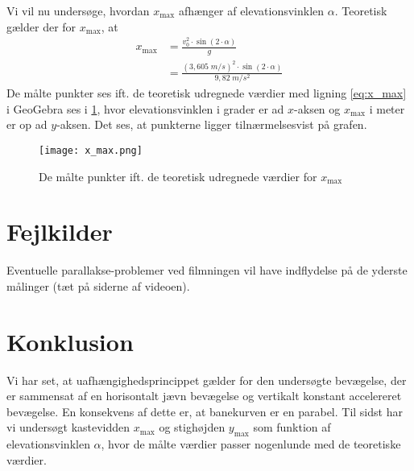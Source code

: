 \documentclass{report}
\begin{document}
Vi vil nu undersøge, hvordan $x_{\text{max} }$ afhænger af elevationsvinklen $\alpha$. 
Teoretisk gælder der for $x_{\text{max} }$, at
\begin{equation}
  \label{eq:x_max}
\begin{split}
  x _{\text{max} }&=\frac{v_0^2 \cdot \sin\left(2 \cdot \alpha\right) }{g}\\
  &=\frac{\left(3,605 \;\unit{m/s} \right)^2 \cdot \sin\left(2 \cdot \alpha\right) }{9,82 \;\unit{m/s^2} }
\end{split}
\end{equation}
De målte punkter ses ift. de teoretisk udregnede værdier med ligning \ref{eq:x_max} i GeoGebra ses i \cref{fig:x_max}, hvor elevationsvinklen i grader er ad $x$-aksen og $x_{\text{max} }$ i meter er op ad $y$-aksen.
Det ses, at punkterne ligger tilnærmelsesvist på grafen.
\begin{figure}[H]
\begin{center}
  \texttt{[image: x\_max.png]}
\end{center}
\caption{De målte punkter ift. de teoretisk udregnede værdier for $x_{\text{max} }$}
\label{fig:x_max}
\end{figure}

\section*{Fejlkilder}
Eventuelle parallakse-problemer ved filmningen vil have indflydelse på de yderste målinger (tæt på siderne af videoen).

\section*{Konklusion}
Vi har set, at uafhængighedsprincippet gælder for den undersøgte bevægelse, der er sammensat af en horisontalt jævn bevægelse og vertikalt konstant accelereret bevægelse.
En konsekvens af dette er, at banekurven er en parabel.
Til sidst har vi undersøgt kastevidden $x_{\text{max} }$ og stighøjden $y_{\text{max} }$ som funktion af elevationsvinklen $\alpha$, hvor de målte værdier passer nogenlunde med de teoretiske værdier. 
\end{document}
